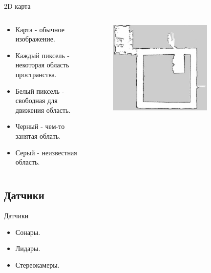 \documentclass[9pt]{beamer}
\begin{document}
\begin{frame}{2D карта}
\begin{columns}
  \begin{column}{0.50\textwidth}
    \begin{itemize}
      \item
      {
        Карта - обычное изображение.
      }
      \item
      {
        Каждый пиксель - некоторая область пространства.
      }
      \item
      {
        Белый пиксель - свободная для движения область. 
      }
      \item
      {
        Черный - чем-то занятая облать.
      }
      \item
      {
        Серый - неизвестная область.
      }
    \end{itemize}
  \end{column}
  \begin{column}{0.50\textwidth}
    \begin{figure}[h]
      \centering
      \includegraphics[width=0.8\textwidth]{grid_map.png}
    \end{figure}
  \end{column}
\end{columns}
\end{frame}

\subsection{Датчики}

\begin{frame}{Датчики}

\begin{itemize}
  \item
  {
    Сонары.
  }
  \item
  {
    Лидары.
  }
  \item
  {
    Стереокамеры.
  }
\end{itemize}

\end{frame}
\end{document}
